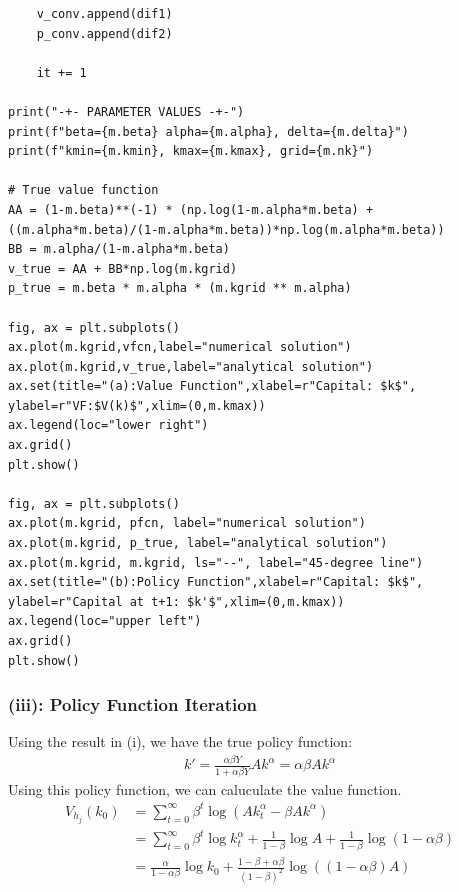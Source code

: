 \documentclass{ltjsarticle}
\begin{document}
\begin{lstlisting}
    v_conv.append(dif1)
    p_conv.append(dif2)

    it += 1

print("-+- PARAMETER VALUES -+-")
print(f"beta={m.beta} alpha={m.alpha}, delta={m.delta}")
print(f"kmin={m.kmin}, kmax={m.kmax}, grid={m.nk}")

# True value function
AA = (1-m.beta)**(-1) * (np.log(1-m.alpha*m.beta) + ((m.alpha*m.beta)/(1-m.alpha*m.beta))*np.log(m.alpha*m.beta))
BB = m.alpha/(1-m.alpha*m.beta)
v_true = AA + BB*np.log(m.kgrid)
p_true = m.beta * m.alpha * (m.kgrid ** m.alpha)

fig, ax = plt.subplots()
ax.plot(m.kgrid,vfcn,label="numerical solution")
ax.plot(m.kgrid,v_true,label="analytical solution")
ax.set(title="(a):Value Function",xlabel=r"Capital: $k$", ylabel=r"VF:$V(k)$",xlim=(0,m.kmax))
ax.legend(loc="lower right")
ax.grid()
plt.show()

fig, ax = plt.subplots()
ax.plot(m.kgrid, pfcn, label="numerical solution")
ax.plot(m.kgrid, p_true, label="analytical solution")
ax.plot(m.kgrid, m.kgrid, ls="--", label="45-degree line")
ax.set(title="(b):Policy Function",xlabel=r"Capital: $k$", ylabel=r"Capital at t+1: $k'$",xlim=(0,m.kmax))
ax.legend(loc="upper left")
ax.grid()
plt.show()
\end{lstlisting}


\subsubsection*{(iii): Policy Function Iteration}
Using the result in (i), we have the true policy function:
\begin{gather*}
    k' = \frac{\alpha \beta Y}{1 + \alpha \beta Y} A k^\alpha = \alpha \beta A k^\alpha
\end{gather*}
Using this policy function, we can caluculate the value function.
\begin{align*}
    V_{h_j}(k_0) 
    &= \sum_{t=0}^{\infty} \beta^t \log \left(A k_t^\alpha - \beta A k^\alpha \right) \\
    &= \sum_{t=0}^{\infty} \beta^t \log k_t^\alpha + \frac{1}{1-\beta}\log A + \frac{1}{1-\beta}\log (1-\alpha\beta)\\
    &= \frac{\alpha}{1-\alpha\beta}\log k_0 + \frac{1-\beta+ \alpha\beta}{(1-\beta)^2}\log ((1-\alpha\beta)A) 
\end{align*}
\end{document}
